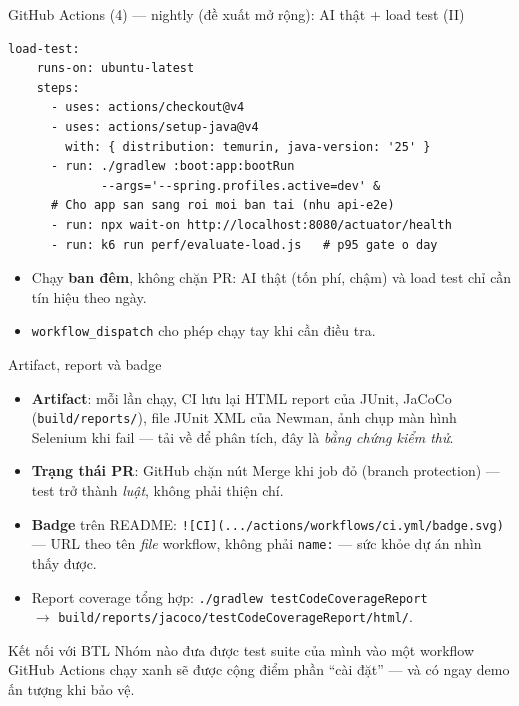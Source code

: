 \documentclass[aspectratio=169,12pt]{beamer}
\begin{document}
\begin{frame}[fragile]{GitHub Actions (4) --- nightly (đề xuất mở rộng): AI thật + load test (II)}
  \vspace*{-0.4em}
\begin{lstlisting}[basicstyle=\ttfamily\scriptsize]
  load-test:
    runs-on: ubuntu-latest
    steps:
      - uses: actions/checkout@v4
      - uses: actions/setup-java@v4
        with: { distribution: temurin, java-version: '25' }
      - run: ./gradlew :boot:app:bootRun
             --args='--spring.profiles.active=dev' &
      # Cho app san sang roi moi ban tai (nhu api-e2e)
      - run: npx wait-on http://localhost:8080/actuator/health
      - run: k6 run perf/evaluate-load.js   # p95 gate o day
\end{lstlisting}

  \begin{itemize}\small
    \item Chạy \textbf{ban đêm}, không chặn PR: AI thật (tốn phí, chậm)
          và load test chỉ cần tín hiệu theo ngày.
    \item \texttt{workflow\_dispatch} cho phép chạy tay khi cần điều tra.
  \end{itemize}
\end{frame}

\begin{frame}[shrink]{Artifact, report và badge}
  \begin{itemize}
    \item \textbf{Artifact}: mỗi lần chạy, CI lưu lại HTML report của JUnit, JaCoCo (\texttt{build/reports/}), file JUnit XML của Newman, ảnh chụp màn hình Selenium khi fail --- tải về để phân tích, đây là \emph{bằng chứng kiểm thử}.
    \item \textbf{Trạng thái PR}: GitHub chặn nút Merge khi job đỏ (branch protection) --- test trở thành \emph{luật}, không phải thiện chí.
    \item \textbf{Badge} trên README: \texttt{![CI](.../actions/workflows/ci.yml/badge.svg)} --- URL theo tên \emph{file} workflow, không phải \texttt{name:} --- sức khỏe dự án nhìn thấy được.
    \item Report coverage tổng hợp: \texttt{./gradlew testCodeCoverageReport}\\ $\rightarrow$ \texttt{build/reports/jacoco/testCodeCoverageReport/html/}.
  \end{itemize}
  \begin{block}{Kết nối với BTL}
    Nhóm nào đưa được test suite của mình vào một workflow GitHub Actions chạy xanh sẽ được cộng điểm phần ``cài đặt'' --- và có ngay demo ấn tượng khi bảo vệ.
  \end{block}
\end{frame}
\end{document}
